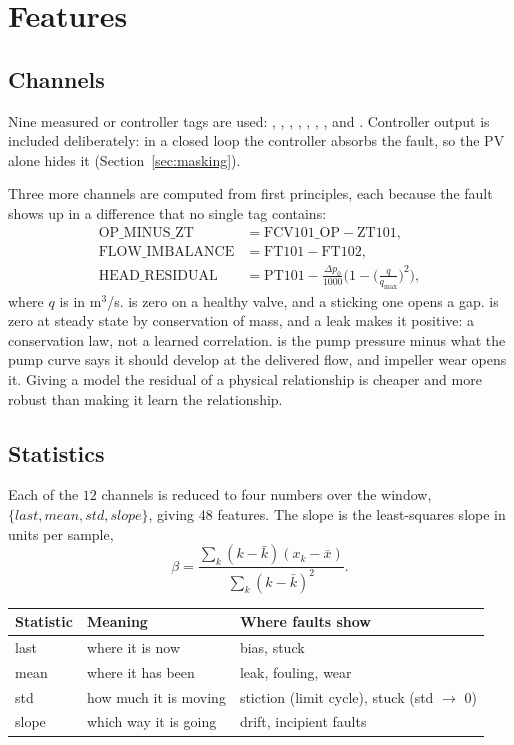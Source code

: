 \section{Features}

\subsection{Channels}
Nine measured or controller tags are used:
, , , , , ,
,  and . Controller output is
included deliberately: in a closed loop the controller absorbs the fault, so
the PV alone hides it (Section~\ref{sec:masking}).

Three more channels are computed from first principles, each because the
fault shows up in a difference that no single tag contains:
\begin{align}
  \text{OP\_MINUS\_ZT} &= \text{FCV101\_OP} - \text{ZT101}, \\
  \text{FLOW\_IMBALANCE} &= \text{FT101} - \text{FT102}, \\
  \text{HEAD\_RESIDUAL} &= \text{PT101} - \frac{\Delta p_0}{1000}
     \Big(1-\big(\tfrac{q}{q_\text{max}}\big)^2\Big),
\end{align}
where $q$ is  in m$^3$/s.
 is zero on a healthy valve, and a sticking one opens a gap.
 is zero at steady state by conservation of mass, and a
leak makes it positive: a conservation law, not a learned correlation.
 is the pump pressure minus what the pump curve says it
should develop at the delivered flow, and impeller wear opens it.
Giving a model the residual of a physical relationship is cheaper and more
robust than making it learn the relationship.

\subsection{Statistics}
Each of the $12$ channels is reduced to four numbers over the window,
$\{\textit{last}, \textit{mean}, \textit{std}, \textit{slope}\}$, giving $48$
features. The slope is the least-squares slope in units per sample,
\begin{equation}
  \beta = \frac{\sum_k (k-\bar k)(x_k - \bar x)}{\sum_k (k-\bar k)^2}.
\end{equation}

\begin{center}
\begin{tabular}{@{}lll@{}}
\toprule
Statistic & Meaning & Where faults show \\
\midrule
last & where it is now & bias, stuck \\
mean & where it has been & leak, fouling, wear \\
std & how much it is moving & stiction (limit cycle), stuck (std $\to$ 0) \\
slope & which way it is going & drift, incipient faults \\
\bottomrule
\end{tabular}
\end{center}

